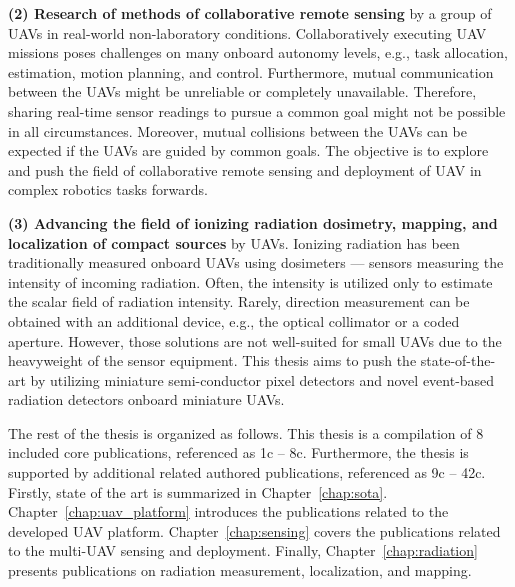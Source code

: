 \documentclass[a4paper,11pt,titlepage,twoside]{book}
\begin{document}
\textbf{(2) Research of methods of collaborative remote sensing} by a group of \aclp{UAV} in real-world non-laboratory conditions.
Collaboratively executing UAV missions poses challenges on many onboard autonomy levels, e.g., task allocation, estimation, motion planning, and control.
Furthermore, mutual communication between the \acp{UAV} might be unreliable or completely unavailable.
Therefore, sharing real-time sensor readings to pursue a common goal might not be possible in all circumstances.
Moreover, mutual collisions between the \acp{UAV} can be expected if the \acp{UAV} are guided by common goals.
The objective is to explore and push the field of collaborative remote sensing and deployment of \ac{UAV} in complex robotics tasks forwards.

\textbf{(3) Advancing the field of ionizing radiation dosimetry, mapping, and localization of compact sources} by \aclp{UAV}.
Ionizing radiation has been traditionally measured onboard \acp{UAV} using dosimeters \cite{nagatani2013emergency, sanada2015aerial, towler2012radiation, jiang2016prototype} --- sensors measuring the intensity of incoming radiation.
Often, the intensity is utilized only to estimate the scalar field of radiation intensity.
Rarely, direction measurement can be obtained with an additional device, e.g., the optical collimator or a coded aperture.
However, those solutions are not well-suited for small \acp{UAV} due to the heavyweight of the sensor equipment.
This thesis aims to push the state-of-the-art by utilizing miniature semi-conductor pixel detectors \cite{llopart2007timepix} and novel event-based radiation detectors \cite{poikela2014timepix3} onboard miniature \acp{UAV}.

The rest of the thesis is organized as follows.
This thesis is a compilation of 8 included core publications, referenced as 1c -- 8c.
Furthermore, the thesis is supported by additional related authored publications, referenced as 9c -- 42c.
Firstly, state of the art is summarized in Chapter~\ref{chap:sota}.
Chapter~\ref{chap:uav_platform} introduces the publications related to the developed \ac{UAV} platform.
Chapter~\ref{chap:sensing} covers the publications related to the multi-\ac{UAV} sensing and deployment.
Finally, Chapter~\ref{chap:radiation} presents publications on radiation measurement, localization, and mapping.



\end{document}
